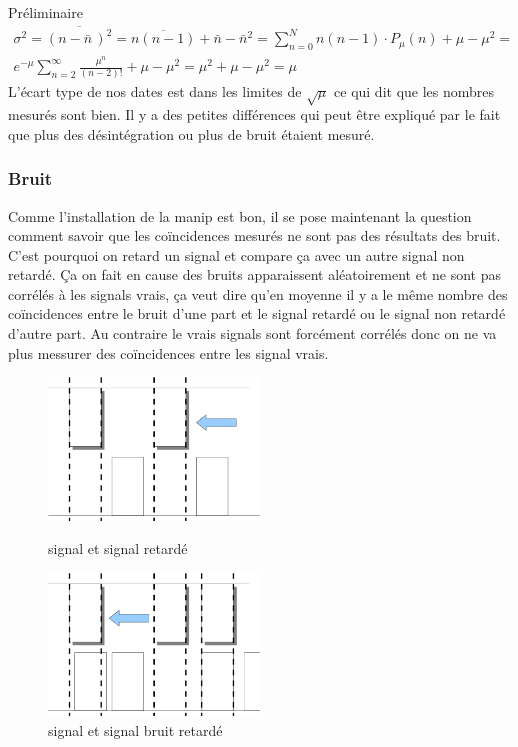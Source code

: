 \documentclass[a4paper,11pt,liststotocnumbered,bibtotocnumbered]{scrartcl}
\begin{document}
\begin{section}{Préliminaire}
    \begin{equation*}
     \begin{split}
      \sigma^2=\overline{(n-\bar{n}\,)^2}=\overline{n(n-1)}+\bar{n}-{\bar{n}}^2=\sum_{n=0} ^{N} n (n-1)\cdot P_{\mu}(n)+\mu -\mu^2=\\
      e^{-{\mu}}\sum_{n=2}^{\infty}\frac{\mu^n}{(n-2)!}+\mu -\mu^2=\mu^2+ \mu -\mu^2=\mu
     \end{split}
    \end{equation*}
    L'écart type de nos dates est dans les limites de $\sqrt{\mu}$ ce qui dit que les nombres mesurés sont bien. Il y a des petites différences qui peut être expliqué par le fait que plus des désintégration ou plus de bruit étaient mesuré.
   \subsubsection{Bruit}
Comme l'installation de la manip est bon, il se pose maintenant la question comment
savoir que les coïncidences mesurés ne sont pas des résultats des bruit. C'est pourquoi on retard un signal et compare \c ca avec un autre signal non retardé. \c Ca on fait en cause des bruits apparaissent aléatoirement et ne sont pas corrélés à les signals vrais, \c ca veut dire qu'en moyenne il y a le même nombre des co\"{i}ncidences entre le bruit d'une part et le signal retardé ou le signal non retardé  d'autre part. Au  contraire le vrais signals sont forcément corrélés donc on ne va plus messurer des co\"{i}ncidences entre les signal vrais.
\begin{figure}[h]
   \begin{minipage}[H]{0.5\textwidth}
        \centering
	\includegraphics[width=0.5\textwidth]{bilder/retard.png}
        \caption{signal et signal retardé }
   \end{minipage}
   \hfill
   \begin{minipage}[H]{0.5\textwidth}
        \centering
       	\includegraphics[width=0.5\textwidth]{bilder/retard2.png}
        \caption{signal et signal bruit retardé}
   \end{minipage}
   \end{figure}
   \newline


\end{section}
\end{document}
